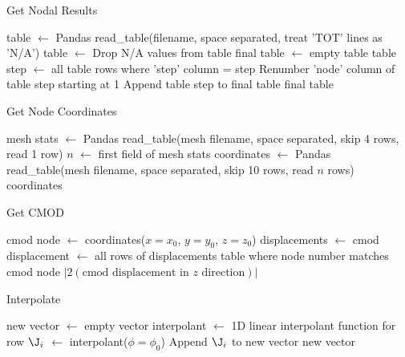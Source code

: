 \begin{algorithm}[tbp]
  \caption{Get Nodal Results}
  \label{alg:get_nodal_results}
  \begin{algorithmic}
  \State table $\gets$ Pandas read\_table(filename, space separated, treat 'TOT' lines as 'N/A')
  \State table $\gets$ Drop N/A values from table
  \State final table $\gets$ empty table
    \State table step $\gets$ all table rows where 'step' column = step
    \State Renumber 'node' column of table step starting at 1
    \State {}
    \State Append table step to final table
  \EndFor
  \State \Return final table
  \EndProcedure
  \end{algorithmic}
\end{algorithm}

\begin{algorithm}[tbp]
  \caption{Get Node Coordinates}
  \label{alg:get_node_coordinates}
  \begin{algorithmic}
  \State mesh stats $\gets$ Pandas read\_table(mesh filename, space separated, skip 4 rows, read 1 row)
  \State $n$ $\gets$ first field of mesh stats
  \State coordinates $\gets$ Pandas read\_table(mesh filename, space separated, skip 10 rows, read $n$ rows)
  \State \Return coordinates
  \EndProcedure
  \end{algorithmic}
\end{algorithm}

\begin{algorithm}[tbp]
  \caption{Get CMOD}
  \label{alg:get_cmod}
  \begin{algorithmic}
  \State cmod node $\gets$ coordinates($x = x_0$, $y = y_0$, $z = z_0$)
  \State displacements $\gets$ 
  \State cmod displacement $\gets$ all rows of displacements table where node number matches cmod node
  \State \Return $|2(\text{cmod displacement in $z$ direction})|$
  \EndProcedure
  \end{algorithmic}
\end{algorithm}

\begin{algorithm}[tbp]
  \caption{Interpolate \J}
  \label{alg:interpolate_j}
  \begin{algorithmic}
  \State new \J vector $\gets$ empty vector
    \State \J interpolant $\gets$ 1D linear interpolant function for row 
    \State $\J_i$ $\gets$ \J interpolant($\phi = \phi_0$)
    \State Append $\J_i$ to new \J vector
  \EndFor
  \Return new \J vector
  \EndProcedure
  \end{algorithmic}
\end{algorithm}

